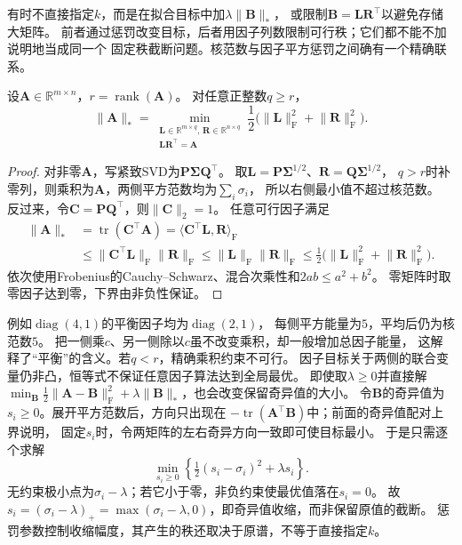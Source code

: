 有时不直接指定$k$，而是在拟合目标中加$\lambda\lVert\bm B\rVert_*$，
或限制$\bm B=\bm L\bm R^\top$以避免存储大矩阵。
前者通过惩罚改变目标，后者用因子列数限制可行秩；它们都不能不加说明地当成同一个
固定秩截断问题。核范数与因子平方惩罚之间确有一个精确联系。
\begin{lemma}[核范数的因子分解表达]
\label{lem:matrix-analysis-nuclear-factorization}
设$\bm A\in\mathbb R^{m\times n}$，$r=\operatorname{rank}(\bm A)$。
对任意正整数$q\geq r$，
\begin{equation}
 \lVert\bm A\rVert_*
 =\min_{\substack{\bm L\in\mathbb R^{m\times q},\,
                  \bm R\in\mathbb R^{n\times q}\\\bm L\bm R^\top=\bm A}}
   \frac12\bigl(\lVert\bm L\rVert_{\mathrm F}^2+\lVert\bm R\rVert_{\mathrm F}^2\bigr).
 \label{eq:matrix-analysis-nuclear-factorization}
\end{equation}
\end{lemma}
\begin{proof}
对非零$\bm A$，写紧致SVD为$\bm P\bm\Sigma\bm Q^\top$。
取$\bm L=\bm P\bm\Sigma^{1/2}$、$\bm R=\bm Q\bm\Sigma^{1/2}$，
$q>r$时补零列，则乘积为$\bm A$，两侧平方范数均为$\sum_i\sigma_i$，
所以右侧最小值不超过核范数。
反过来，令$\bm C=\bm P\bm Q^\top$，则$\lVert\bm C\rVert_2=1$。
任意可行因子满足
\[
 \begin{aligned}
 \lVert\bm A\rVert_*
 &=\operatorname{tr}(\bm C^\top\bm A)
   =\langle\bm C^\top\bm L,\bm R\rangle_{\mathrm F}\\
 &\leq\lVert\bm C^\top\bm L\rVert_{\mathrm F}\lVert\bm R\rVert_{\mathrm F}
 \leq\lVert\bm L\rVert_{\mathrm F}\lVert\bm R\rVert_{\mathrm F}
 \leq\tfrac12\bigl(\lVert\bm L\rVert_{\mathrm F}^2+
                   \lVert\bm R\rVert_{\mathrm F}^2\bigr).
 \end{aligned}
\]
依次使用Frobenius的Cauchy--Schwarz、混合次乘性和$2ab\leq a^2+b^2$。
零矩阵时取零因子达到零，下界由非负性保证。
\end{proof}

例如$\operatorname{diag}(4,1)$的平衡因子均为$\operatorname{diag}(2,1)$，
每侧平方能量为$5$，平均后仍为核范数$5$。
把一侧乘$c$、另一侧除以$c$虽不改变乘积，却一般增加总因子能量，
这解释了“平衡”的含义。若$q<r$，精确乘积约束不可行。
因子目标关于两侧的联合变量仍非凸，恒等式不保证任意因子算法达到全局最优。
即使取$\lambda\geq0$并直接解
$\min_{\bm B}\tfrac12\lVert\bm A-\bm B\rVert_{\mathrm F}^2
+\lambda\lVert\bm B\rVert_*$，也会改变保留奇异值的大小。
令$\bm B$的奇异值为$s_i\geq0$。展开平方范数后，方向只出现在
$-\operatorname{tr}(\bm A^\top\bm B)$中；前面的奇异值配对上界说明，
固定$s_i$时，令两矩阵的左右奇异方向一致即可使目标最小。
于是只需逐个求解
\[
 \min_{s_i\geq0}\left\{\tfrac12(s_i-\sigma_i)^2+\lambda s_i\right\}.
\]
无约束极小点为$\sigma_i-\lambda$；若它小于零，非负约束使最优值落在$s_i=0$。
故$s_i=(\sigma_i-\lambda)_+=\max(\sigma_i-\lambda,0)$，即奇异值收缩，而非保留原值的截断。
惩罚参数控制收缩幅度，其产生的秩还取决于原谱，不等于直接指定$k$。



